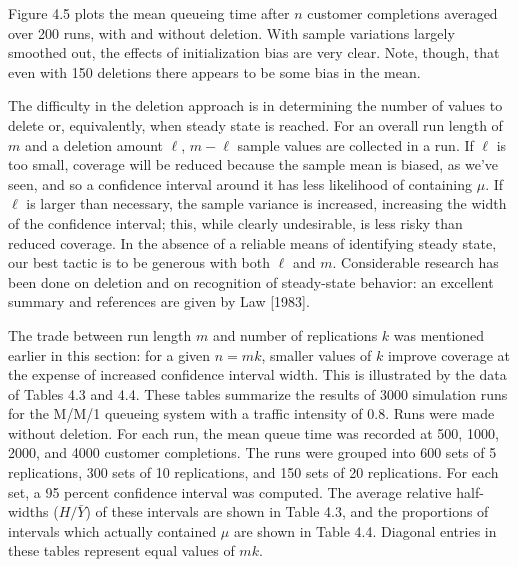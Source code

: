 Figure 4.5 plots the mean queueing time after $n$ customer completions
averaged over 200 runs, with and without deletion. With sample variations
largely smoothed out, the effects of initialization bias are very clear. Note,
though, that even with 150 deletions there appears to be some bias in the
mean.

The difficulty in the deletion approach is in determining the number of
values to delete or, equivalently, when steady state is reached. For an
overall run length of $m$ and a deletion amount $\ell$, $m-\ell$ sample values are
collected in a run. If $\ell$ is too small, coverage will be reduced because the
sample mean is biased, as we've seen, and so a confidence interval around it
has less likelihood of containing $\mu$. If $\ell$ is larger than necessary, the
sample variance is increased, increasing the width of the confidence interval;
this, while clearly undesirable, is less risky than reduced coverage. In the
absence of a reliable means of identifying steady state, our best tactic is to be
generous with both $\ell$ and $m$. Considerable research has been done on deletion
and on recognition of steady-state behavior: an excellent summary and
references are given by Law [1983].

The trade between run length $m$ and number of replications $k$ was
mentioned earlier in this section: for a given $n = mk$, smaller values of $k$
improve coverage at the expense of increased confidence interval width.
This is illustrated by the data of Tables 4.3 and 4.4. These tables summarize
the results of 3000 simulation runs for the M/M/1 queueing system with a
traffic intensity of 0.8. Runs were made without deletion. For each run, the
mean queue time was recorded at 500, 1000, 2000, and 4000 customer
completions. The runs were grouped into 600 sets of 5 replications, 300 sets of
10 replications, and 150 sets of 20 replications. For each set, a 95 percent
confidence interval was computed. The average relative half-widths
($H/\bar{Y}$) of these intervals are shown in Table 4.3, and the proportions of
intervals which actually contained $\mu$ are shown in Table 4.4. Diagonal entries
in these tables represent equal values of $mk$.

